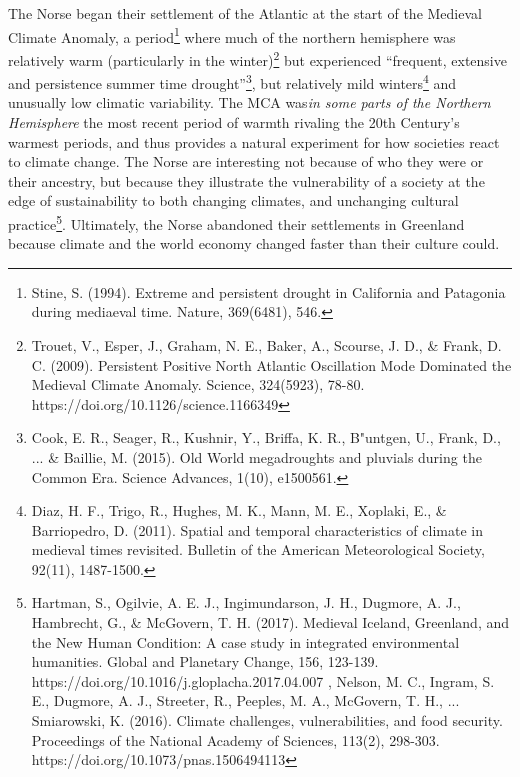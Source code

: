 The Norse began their settlement of the Atlantic at the start of the Medieval Climate Anomaly, a period\footnote{Stine, S. (1994). Extreme and persistent drought in California and Patagonia during mediaeval time. Nature, 369(6481), 546.} where much of the northern hemisphere was relatively warm (particularly in the winter)\footnote{Trouet, V., Esper, J., Graham, N. E., Baker, A., Scourse, J. D., \& Frank, D. C. (2009). Persistent Positive North Atlantic Oscillation Mode Dominated the Medieval Climate Anomaly. Science, 324(5923), 78-80. https://doi.org/10.1126/science.1166349} but experienced ``frequent, extensive and persistence summer time drought''\footnote{Cook, E. R., Seager, R., Kushnir, Y., Briffa, K. R., B"untgen, U., Frank, D., ... \& Baillie, M. (2015). Old World megadroughts and pluvials during the Common Era. Science Advances, 1(10), e1500561.}, but relatively mild winters\footnote{Diaz, H. F., Trigo, R., Hughes, M. K., Mann, M. E., Xoplaki, E., \& Barriopedro, D. (2011). Spatial and temporal characteristics of climate in medieval times revisited. Bulletin of the American Meteorological Society, 92(11), 1487-1500.} and unusually low climatic variability. The MCA was\emph{in some parts of the Northern Hemisphere} the most recent period of warmth rivaling the 20th Century's warmest periods, and thus provides a natural experiment for how societies react to climate change. The Norse are interesting not because of who they were or their ancestry, but because they illustrate the vulnerability of a society at the edge of sustainability to both changing climates, and unchanging cultural practice\footnote{Hartman, S., Ogilvie, A. E. J., Ingimundarson, J. H., Dugmore, A. J., Hambrecht, G., \& McGovern, T. H. (2017). Medieval Iceland, Greenland, and the New Human Condition: A case study in integrated environmental humanities. Global and Planetary Change, 156, 123-139. https://doi.org/10.1016/j.gloplacha.2017.04.007
, Nelson, M. C., Ingram, S. E., Dugmore, A. J., Streeter, R., Peeples, M. A., McGovern, T. H., ... Smiarowski, K. (2016). Climate challenges, vulnerabilities, and food security. Proceedings of the National Academy of Sciences, 113(2), 298-303. https://doi.org/10.1073/pnas.1506494113}. Ultimately, the Norse abandoned their settlements in Greenland because climate and the world economy changed faster than their culture could. \\

